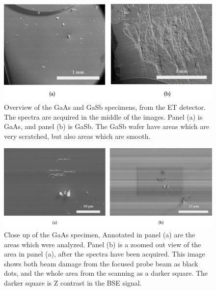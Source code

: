\begin{figure}[phtb]
    \centering
    \includegraphics[width=.99\textwidth]{figures/SE_images/Overview_GaAs_GaSb.jpg}
    \caption{
        Overview of the GaAs and GaSb specimens, from the ET detector.
        The spectra are acquired in the middle of the images.
        Panel (a) is GaAs, and panel (b) is GaSb.
        The GaSb wafer have areas which are very scratched, but also areas which are smooth.
    }
    \label{fig:SE_images:Overview_GaAs_GaSb}
\end{figure}

\begin{figure}[phtb]
    \centering
    \includegraphics[width=.99\textwidth]{figures/SE_images/GaAs_close.jpg}
    \caption{
        Close up of the GaAs specimen, 
        Annotated in panel (a) are the areas which were analyzed.
        Panel (b) is a zoomed out view of the area in panel (a), after the spectra have been acquired.
        This image shows both beam damage from the focused probe beam as black dots, and the whole area from the scanning as a darker square.
        The darker square is Z contrast in the BSE signal.
    }
    \label{fig:SE_images:GaAs}
\end{figure}


